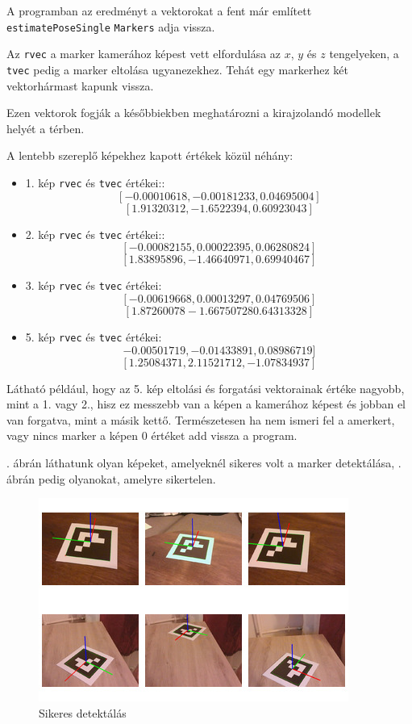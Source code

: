 A programban az eredményt a vektorokat a fent már említett \texttt{estimatePoseSingle} \texttt{Markers} adja vissza.

Az \texttt{rvec} a marker kamerához képest vett elfordulása az $x$, $y$ és $z$ tengelyeken, a \texttt{tvec} pedig a marker eltolása ugyanezekhez. Tehát egy markerhez két vektorhármast kapunk vissza.

Ezen vektorok fogják a későbbiekben meghatározni a kirajzolandó modellek helyét a térben.

A lentebb szereplő képekhez kapott értékek közül néhány:
\begin{itemize}
\item 1. kép \texttt{rvec} és \texttt{tvec} értékei::
\[[-0.00010618, -0.00181233, 0.04695004]\]
\[[ 1.91320312, -1.6522394,  0.60923043]\]
\item 2. kép \texttt{rvec} és \texttt{tvec} értékei::
\[[-0.00082155,  0.00022395,  0.06280824]\]
\[[ 1.83895896, -1.46640971,  0.69940467]\]
\item 3. kép \texttt{rvec} és \texttt{tvec} értékei:
\[[-0.00619668, 0.00013297,  0.04769506]\]
\[[ 1.87260078 -1.66750728  0.64313328]\]
\item 5. kép \texttt{rvec} és \texttt{tvec} értékei:
\[-0.00501719, -0.01433891,  0.08986719]\]
\[[ 1.25084371,  2.11521712, -1.07834937]\]
\end{itemize}

Látható például, hogy az 5. kép eltolási és forgatási vektorainak értéke nagyobb, mint a 1. vagy 2., hisz ez messzebb van a képen a kamerához képest és jobban el van forgatva, mint a másik kettő.
Természetesen ha nem ismeri fel a amerkert, vagy nincs marker a képen 0 értéket add vissza a program.

. ábrán láthatunk olyan képeket, amelyeknél sikeres volt a marker detektálása, . ábrán pedig olyanokat, amelyre sikertelen.

\begin{figure}[htp]
    \centering
   	\includegraphics[width=\textwidth]{images/detect.jpg}
	\caption{Sikeres detektálás}
	\label{fig:detect}
\end{figure}

